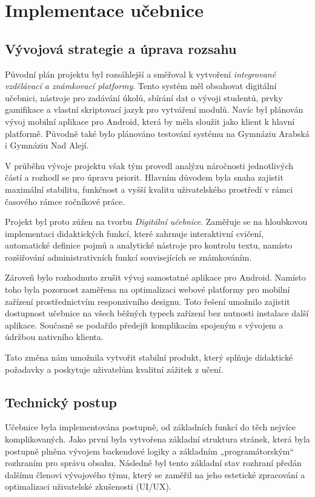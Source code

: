 \documentclass[12pt]{article}
\begin{document}
\newpage
\section{Implementace učebnice}

\subsection{Vývojová strategie a úprava rozsahu}

Původní plán projektu byl rozsáhlejší a směřoval k vytvoření \textit{integrované vzdělávací a známkovací platformy}. Tento systém měl obsahovat digitální učebnici, nástroje pro zadávání úkolů, sbírání dat o vývoji studentů, prvky gamifikace a vlastní skriptovací jazyk pro vytváření modulů. Navíc byl plánován vývoj mobilní aplikace pro Android, která by měla sloužit jako klient k hlavní platformě. Původně také bylo plánováno testování systému na Gymnáziu Arabská i Gymnáziu Nad Alejí.

V průběhu vývoje projektu však tým provedl analýzu náročnosti jednotlivých částí a rozhodl se pro úpravu priorit. Hlavním důvodem byla snaha zajistit maximální stabilitu, funkčnost a vyšší kvalitu uživatelského prostředí v rámci časového rámce ročníkové práce.

Projekt byl proto zúžen na tvorbu \textit{Digitální učebnice}. Zaměřuje se na hloubkovou implementaci didaktických funkcí, které zahrnuje interaktivní cvičení, automatické definice pojmů a analytické nástroje pro kontrolu textu, namísto rozšiřování administrativních funkcí souvisejících se známkováním.

Zároveň bylo rozhodnuto zrušit vývoj samostatné aplikace pro Android. Namísto toho byla pozornost zaměřena na optimalizaci webové platformy pro mobilní zařízení prostřednictvím responzivního designu. Toto řešení umožnilo zajistit dostupnost učebnice na všech běžných typech zařízení bez nutnosti instalace další aplikace. Současně se podařilo předejít komplikacím spojeným s vývojem a údržbou nativního klienta.

Tato změna nám umožnila vytvořit stabilní produkt, který splňuje didaktické požadavky a poskytuje uživatelům kvalitní zážitek z učení.

\subsection{Technický postup}
Učebnice byla implementována postupně, od základních funkcí do těch nejvíce komplikovaných. Jako první byla vytvořena základní struktura stránek, která byla postupně plněna vývojem backendové logiky a základním „programátorským“ rozhraním pro správu obsahu. Následně byl tento základní stav rozhraní předán dalšímu členovi vývojového týmu, který se zaměřil na jeho estetické zpracování a optimalizaci uživatelské zkušenosti (UI/UX).
\end{document}
